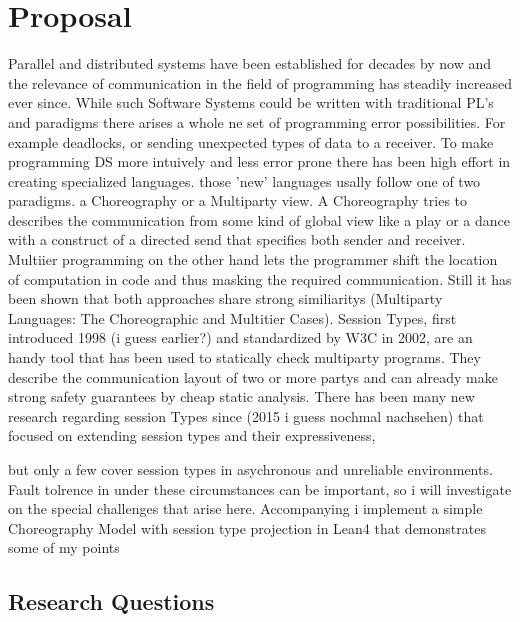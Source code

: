 \documentclass[
	ngerman,
	ruledheaders=section,%
	class=report,%
	thesis={type=master},%
	accentcolor=9c,%
	custommargins=true,%
	marginpar=false,%
	parskip=half-,%
	fontsize=11pt,%
]{tudapub}
\begin{document}
\chapter{Proposal}
Parallel and distributed systems have been established for decades by now and the relevance of communication in the field of programming has steadily increased ever since. While such Software Systems could be written with traditional PL's and paradigms there arises a whole ne set of programming error possibilities. For example deadlocks, or sending unexpected types of data to a receiver.
To make programming DS more intuively and less error prone there has been high effort in creating specialized languages. those 'new' languages usally follow one of two paradigms.
a Choreography or a Multiparty view. A Choreography tries to describes the communication from some kind of global view like a play or a dance with a construct of a directed send that specifies both sender and receiver. Multiier programming on the other hand lets the programmer shift the location of computation in code and thus masking the required communication. Still it has been shown that both approaches share strong similiaritys (Multiparty Languages: The Choreographic and
Multitier Cases).
Session Types, first introduced 1998 (i guess earlier?) and standardized by W3C in 2002, are an handy tool that has been used to statically check multiparty programs. They describe the communication layout of two or more partys and can already make strong safety guarantees by cheap static analysis. There has been many new research regarding session Types since (2015 i guess nochmal nachsehen) that focused on extending session types and their expressiveness, \par but only a few cover session types in asychronous and unreliable environments. Fault tolrence in under these circumstances can be important, so i will investigate on the special challenges that arise here. Accompanying i implement a simple Choreography Model with session type projection in Lean4 that demonstrates some of my points

\section{Research Questions}
\end{document}
